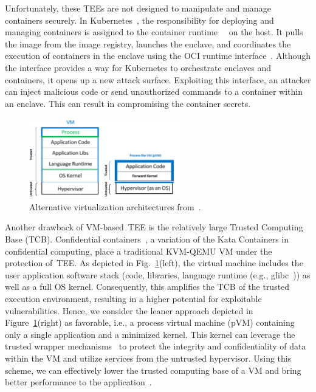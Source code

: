 Unfortunately, these \acrshort{TEE}s are not designed to manipulate and manage containers securely. In Kubernetes~\cite*{k8s}, the responsibility for deploying and managing containers is assigned to the container runtime~\cite*{containerd}~\cite*{cri-o} on the host. It pulls the image from the image registry, launches the enclave, and coordinates the 
execution of containers in the enclave using the OCI runtime interface~\cite*{oci-runtime-spec}. Although the interface provides a way for Kubernetes to orchestrate enclaves and containers, it opens up a new attack surface. Exploiting this interface, an attacker can inject malicious code or send unauthorized commands to 
a container within an enclave. This can result in compromising the container secrets.
 
 
\begin{figure}[!htb]
  \centering
  \includegraphics[width=0.6\textwidth]{images/VM_vs_PVM.png}
  \caption[Alternative virtualization architectures.]{Alternative virtualization architectures from~\cite*{10.1145/3436512}.}
  \label{fig:VM_vs_PVM}
\end{figure}
 
Another drawback of VM-based~\acrshort{TEE} is the relatively large Trusted Computing Base (\acrshort{TCB}). Confidential containers~\cite*{confidential_kata}, a variation of the Kata Containers in confidential computing, place a traditional KVM-QEMU VM under the protection of~\acrshort{TEE}. As depicted in Fig.~\ref{fig:VM_vs_PVM}(left), the virtual machine includes the 
user application software stack (code, libraries, language runtime (e.g., glibc~\cite*{glibc})) as well as a full OS kernel. Consequently, this amplifies the \acrshort{TCB} of the trusted execution environment, resulting in a higher potential for exploitable vulnerabilities. Hence, we consider 
the leaner approach depicted in Figure~\ref{fig:VM_vs_PVM}(right) as favorable, i.e., a process virtual machine (\acrshort{pVM}) containing only a single application and a minimized kernel. This kernel can leverage the trusted wrapper mechanisms~\cite*{Hoekstra2013UsingII} to protect the integrity and confidentiality of data within the VM and utilize services 
from the untrusted hypervisor. Using this scheme, we can effectively lower the trusted computing base of a VM and bring better performance to the application~\cite*{quark_performance_report}.
 

